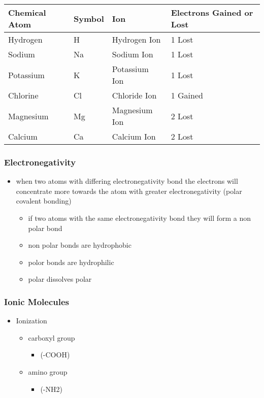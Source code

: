 \documentclass[11pt]{article}
\begin{document}
\begin{center}
\begin{tabular}{llll}
Chemical Atom & Symbol & Ion & Electrons Gained or Lost\\
\hline
Hydrogen & H & Hydrogen Ion & 1 Lost\\
Sodium & Na & Sodium Ion & 1 Lost\\
Potassium & K & Potassium Ion & 1 Lost\\
Chlorine & Cl & Chloride Ion & 1 Gained\\
Magnesium & Mg & Magnesium Ion & 2 Lost\\
Calcium & Ca & Calcium Ion & 2 Lost\\
\end{tabular}
\end{center}
\subsubsection{Electronegativity}
\label{sec:org5ec3bdf}
\begin{itemize}
\item when two atoms with differing electronegativity bond the electrons will concentrate more towards the atom with greater electronegativity (polar covalent bonding)
\begin{itemize}
\item if two atoms with the same electronegativity bond they will form a non polar bond
\item non polar bonds are hydrophobic
\item polor bonds are hydrophilic
\item polar dissolves polar
\end{itemize}
\end{itemize}
\subsubsection{Ionic Molecules}
\label{sec:org7cbcd1a}
\begin{itemize}
\item Ionization
\begin{itemize}
\item carboxyl group
\begin{itemize}
\item (-COOH)
\end{itemize}
\item amino group
\begin{itemize}
\item (-NH2)
\end{itemize}
\end{itemize}
\end{itemize}
\end{document}

